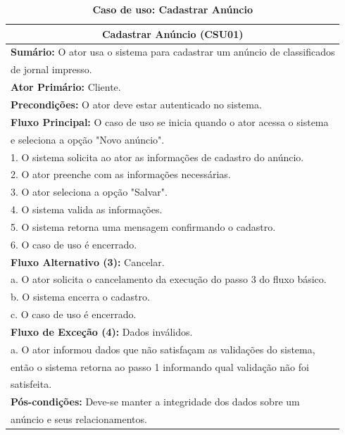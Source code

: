 \documentclass[
	12pt,				%
	openright,			%
	oneside,			%
	a4paper,			%
	chapter=TITLE,		%
	section=TITLE,		%
	english,			%
	french,				%
	spanish,			%
	brazil				%
	]{abntex2}
\begin{document}
\begin{table}[Htp!]
	\begin{center}
		\def\arraystretch{1.5}
		\caption{\textbf{Caso de uso: Cadastrar Anúncio}}
		\label{tab-csu-cadastrarAnuncio}
		\begin{tabular}{|l|}
			\hline
			\multicolumn{1}{|c|}{\textbf{Cadastrar Anúncio (CSU01)}} \\ \hline
			
			
			\textbf{Sumário:} O ator usa o sistema para cadastrar um anúncio de classificados \\de jornal impresso. \\
			\textbf{Ator Primário:} Cliente. \\
			\textbf{Precondições:} O ator deve estar autenticado no sistema. \\ \hline
			
			\textbf{Fluxo Principal:} O caso de uso se inicia quando o ator acessa o sistema\\ e seleciona a opção "Novo anúncio". \\
			
			
			1.	O sistema solicita ao ator as informações de cadastro do anúncio. \\
			2.	O ator preenche com as informações necessárias. \\
			3.  O ator seleciona a opção "Salvar". \\
			4.  O sistema valida as informações. \\
			5.  O sistema retorna uma mensagem confirmando o cadastro. \\
			6.	O caso de uso é encerrado. \\ \hline
			
			\textbf{Fluxo Alternativo (3):} Cancelar.\\ 
			a. O ator solicita o cancelamento da execução do passo 3 do fluxo básico.\\
			b. O sistema encerra o cadastro. \\
			c. O caso de uso é encerrado. \\ \hline
			
			\textbf{Fluxo de Exceção (4):} Dados inválidos.\\
			a. O ator informou dados que não satisfaçam as validações do sistema, \\então o sistema retorna ao passo 1 informando qual validação não foi\\ satisfeita.\\ \hline
			
			\textbf{Pós-condições:} Deve-se manter a integridade dos dados sobre um\\ anúncio e seus relacionamentos. \\ \hline
			
		\end{tabular}
	\end{center}
\end{table}
\end{document}
